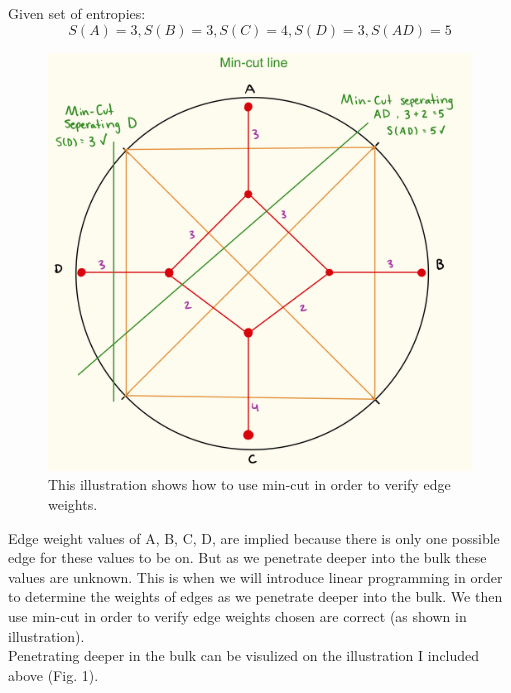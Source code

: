 \documentclass[12pt]{article}
\begin{document}
Given set of entropies: 
\[
    S(A) = 3, S(B) = 3, S(C) = 4, S(D) = 3, S(AD) = 5
\]
\begin{figure}[htbp]
    \centering
    \includegraphics[width=\textwidth]{mincut.jpeg}  
    \caption{This illustration shows how to use min-cut in order to verify edge weights.}  
    \label{fig:mincut example}  
\end{figure}

Edge weight values of A, B, C, D, are implied because there is only one possible edge for these values to be on. But as we penetrate deeper into the bulk these values are unknown. This is when we will introduce linear programming in order to determine the weights of edges as we penetrate deeper into the bulk. We then use min-cut in order to verify edge weights chosen are correct (as shown in illustration).
\\

Penetrating deeper in the bulk can be visulized on the illustration I included above (Fig. 1).
\end{document}

